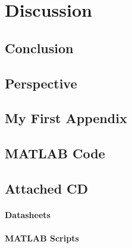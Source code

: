 \part{Discussion}\label{part:part3}
\chapter{Conclusion}\label{chap:conclusion}


\chapter{Perspective}\label{chap:perspektivering}


\begingroup
\raggedright
\clearpage
{}

\endgroup
\label{sourceliste}

\newpage

\begin{appendices}
\appendix
\renewcommand{\appendixname}{Appendix}
\renewcommand{\appendixtocname}{Appendix}

\chapter{My First Appendix}\label{app:vest}

\chapter{MATLAB Code}\label{app:source}

\chapter{Attached CD} \label{chap:cd}
\subsection*{Datasheets}
\subsection*{MATLAB Scripts}

\end{appendices}
